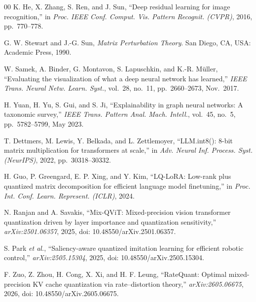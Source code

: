 \begin{thebibliography}{00}
K. He, X. Zhang, S. Ren, and J. Sun, ``Deep residual learning for image
recognition,'' in \textit{Proc. IEEE Conf. Comput. Vis. Pattern Recognit.
(CVPR)}, 2016, pp.\ 770--778.

G. W. Stewart and J.-G. Sun, \textit{Matrix Perturbation Theory}. San Diego, CA,
USA: Academic Press, 1990.

W. Samek, A. Binder, G. Montavon, S. Lapuschkin, and K.-R. M\"uller, ``Evaluating
the visualization of what a deep neural network has learned,'' \textit{IEEE
Trans. Neural Netw. Learn. Syst.}, vol.\ 28, no.\ 11, pp.\ 2660--2673, Nov.\
2017.

H. Yuan, H. Yu, S. Gui, and S. Ji, ``Explainability in graph neural networks: A
taxonomic survey,'' \textit{IEEE Trans. Pattern Anal. Mach. Intell.}, vol.\ 45,
no.\ 5, pp.\ 5782--5799, May 2023.

T. Dettmers, M. Lewis, Y. Belkada, and L. Zettlemoyer, ``LLM.int8(): 8-bit matrix
multiplication for transformers at scale,'' in \textit{Adv. Neural Inf. Process.
Syst. (NeurIPS)}, 2022, pp.\ 30318--30332.

H. Guo, P. Greengard, E. P. Xing, and Y. Kim, ``LQ-LoRA: Low-rank plus quantized
matrix decomposition for efficient language model finetuning,'' in \textit{Proc.
Int. Conf. Learn. Represent. (ICLR)}, 2024.

\bibitem{ranjan2025mixqvit}
N. Ranjan and A. Savakis, ``Mix-QViT: Mixed-precision vision transformer
quantization driven by layer importance and quantization sensitivity,''
\textit{arXiv:2501.06357}, 2025, doi: 10.48550/arXiv.2501.06357.

S. Park \textit{et al.}, ``Saliency-aware quantized imitation learning for
efficient robotic control,'' \textit{arXiv:2505.15304}, 2025, doi:
10.48550/arXiv.2505.15304.

F. Zuo, Z. Zhou, H. Cong, X. Xi, and H. F. Leung, ``RateQuant: Optimal
mixed-precision KV cache quantization via rate--distortion theory,''
\textit{arXiv:2605.06675}, 2026, doi: 10.48550/arXiv.2605.06675.

\end{thebibliography}
